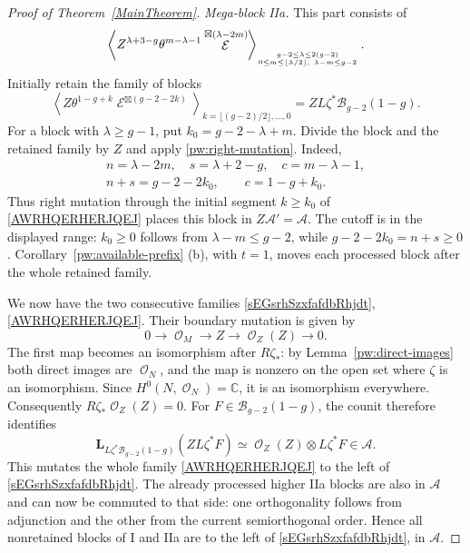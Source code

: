 \documentclass[10pt,a4paper]{amsart}
\DeclareMathOperator{\cE}{\mathcal{E}}
\DeclareMathOperator{\cO}{\mathcal{O}}
\begin{document}
\begin{proof}[Proof of Theorem~\ref{MainTheorem}]
\smallskip
\noindent\textit{Mega-block IIa.}
This part consists of
\begin{equation}\label{sBGASFNADNM}
 \left\langle Z^{\lambda+3-g}\theta^{m-\lambda-1}
              \cE^{\boxtimes(\lambda-2m)}\right\rangle_{{g-2\leq\lambda\leq2(g-2)}\atop
        {0\leq m\leq\lfloor\lambda/2\rfloor,\ \lambda-m\leq g-2}}.
\end{equation}
Initially retain the  family of blocks
\begin{equation}\label{AWRHQERHERJQEJ}
 \left\langle Z\theta^{1-g+k}\cE^{\boxtimes(g-2-2k)}
 \right\rangle_{k=\lfloor(g-2)/2\rfloor,\ldots,0}
       =ZL\zeta^*\mathcal B_{g-2}(1-g).
\end{equation}
For a block with $\lambda\geq g-1$, put
$k_0=g-2-\lambda+m$.  Divide the block and the retained family by
$Z$ and apply \eqref{pw:right-mutation}.  Indeed,
\[
 \begin{gathered}
 n=\lambda-2m,\quad s=\lambda+2-g,\quad c=m-\lambda-1,\\
 n+s=g-2-2k_0,\qquad c=1-g+k_0.
 \end{gathered}
\]
Thus right mutation through the initial segment $k\geq k_0$ of
\eqref{AWRHQERHERJQEJ} places this block in
$Z\mathcal A'=\mathcal A$.  The cutoff is in the displayed range:
$k_0\geq0$ follows from $\lambda-m\leq g-2$, while
$g-2-2k_0=n+s\geq0$.  
Corollary~\ref{pw:available-prefix} (b), with
$t=1$, moves each processed block after the whole retained family.

We now have the two consecutive families
\eqref{sEGsrhSzxfafdbRhjdt}, \eqref{AWRHQERHERJQEJ}.
Their boundary mutation is  given by
\begin{equation}\label{pw:positive-boundary-sequence}
 0\longrightarrow\cO_M\longrightarrow Z
       \longrightarrow\cO_Z(Z)\longrightarrow0.
\end{equation}
The first map becomes an isomorphism after $R\zeta_*$:
by Lemma~\ref{pw:direct-images} both direct images are $\cO_N$,
and the map is nonzero on the open set where $\zeta$ is an
isomorphism.  Since $H^0(N,\cO_N)=\mathbb C$, it is an isomorphism
everywhere.  Consequently $R\zeta_*\cO_Z(Z)=0$.
For $F\in\mathcal B_{g-2}(1-g)$, the counit therefore identifies
\begin{equation}\label{pw:positive-boundary-mutation}
 \mathbf L_{L\zeta^*\mathcal B_{g-2}(1-g)}(ZL\zeta^*F)
       \simeq\cO_Z(Z)\otimes L\zeta^*F\in\mathcal A.
\end{equation}
This mutates the whole family \eqref{AWRHQERHERJQEJ} to the left
of \eqref{sEGsrhSzxfafdbRhjdt}.  The already processed higher IIa
blocks are also in $\mathcal A$ and can now be commuted to that
side: one orthogonality follows from adjunction and the other from
the current semiorthogonal order.  Hence all nonretained blocks of
I and IIa are to the left of \eqref{sEGsrhSzxfafdbRhjdt}, in
$\mathcal A$.


\end{proof}
\end{document}
